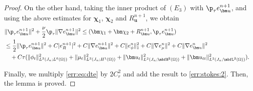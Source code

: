 \begin{proof}
	On the other hand, taking the inner product of $(E_3)$  with $\p_\tau e_{\bm u}^{n+1}$, and using the above estimates for $\bm \chi_1$, $\bm \chi_2$ and $R_{\bm u}^{n+1}$, we obtain
	\begin{equation} \label{err:eq:dte}
		\begin{aligned}
			& \|\p_\tau e_{\bm u}^{n+1}\|^2 +\frac{\nu}{2}  \p_\tau\|\nabla e_{\bm u}^{n+1}\|^2
			\le (\bm \chi_1 + \bm \chi_2 + R_{\bm u}^{n+1},  \p_\tau e_{\bm u}^{n+1})\\
			& \le \frac{1}{2}\|\p_\tau e_{\bm u}^{n+1}\|^2 +   C |e_R^{n+1}|^2 + C \|\nabla e_{\bm u}^{n+1}\|^2 + C\|e_{\phi}^n\|_1^2+ C \|\nabla e_\mu^n\|^2+  C\|\nabla e_{\bm u}^{n}\|^2  \\ %
			& \quad + C\tau(\|\phi_t\|_{L^2(J_n ; L^6(\Omega))}^2 +\|\mu_t\|_{L^2(J_n ; H^1(\Omega))}^2+\|\bm u_t\|_{L^2(J_n ; \mbfH^2(\Omega))}^2+\|\bm u_{tt}\|_{L^2(J_n; \mbfL^2(\Omega))}^2).
		\end{aligned}
	\end{equation}
	
	Finally, we multiply \eqref{err:eq:dte}  by $2C_r^2$ and add the result to \eqref{err:stokes:2}. Then, the lemma is proved.
\end{proof}

